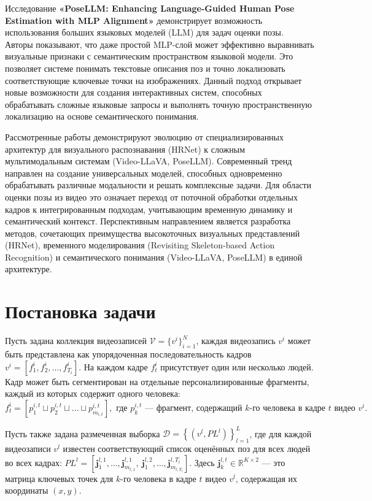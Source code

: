\documentclass{article}
\begin{document}
Исследование \textbf{«PoseLLM: Enhancing Language-Guided Human Pose Estimation with MLP Alignment»} демонстрирует возможность использования больших языковых моделей (LLM) для задач оценки позы. Авторы показывают, что даже простой MLP-слой может эффективно выравнивать визуальные признаки с семантическим пространством языковой модели. Это позволяет системе понимать текстовые описания поз и точно локализовать соответствующие ключевые точки на изображениях. Данный подход открывает новые возможности для создания интерактивных систем, способных обрабатывать сложные языковые запросы и выполнять точную пространственную локализацию на основе семантического понимания.

Рассмотренные работы демонстрируют эволюцию от специализированных архитектур для визуального распознавания (HRNet) к сложным мультимодальным системам (Video-LLaVA, PoseLLM). Современный тренд направлен на создание универсальных моделей, способных одновременно обрабатывать различные модальности и решать комплексные задачи. Для области оценки позы из видео это означает переход от поточной обработки отдельных кадров к интегрированным подходам, учитывающим временную динамику и семантический контекст. Перспективным направлением является разработка методов, сочетающих преимущества высокоточных визуальных представлений (HRNet), временного моделирования (Revisiting Skeleton-based Action Recognition) и семантического понимания (Video-LLaVA, PoseLLM) в единой архитектуре.

\section{Постановка задачи}

Пусть задана коллекция видеозаписей $
\mathcal{V} = \{v^i\}_{i=1}^N$, каждая видеозапись $v^i$ может быть представлена как упорядоченная последовательность кадров $
v^i = [f^i_1, f^i_2, \dots, f^i_{T_i}].
$
На каждом кадре $f^i_t$ присутствует один или несколько людей. Кадр может быть сегментирован на отдельные персонализированные фрагменты, каждый из которых содержит одного человека:
$$
f^i_t = [p^{i,t}_1 \sqcup p^{i,t}_2 \sqcup \dots \sqcup p^{i,t}_{m_{i,t}}],
\text{ где $p^{i,t}_k$ — фрагмент, содержащий $k$-го человека в кадре $t$ видео $v^i$}.
$$

Пусть также задана размеченная выборка $
\mathcal{D} = \left\{ (v^l, PL^l) \right\}_{l=1}^L$,
где для каждой видеозаписи $v^l$ известен соответствующий список оценённых поз для всех людей во всех кадрах:
$
PL^l = \left[ \mathbf{j}^{l,1}_1, \dots, \mathbf{j}^{l,1}_{m_{l,1}}, \ \mathbf{j}^{l,2}_1, \dots, \mathbf{j}^{l,T_l}_{m_{l,T_l}} \right].
$
Здесь $\mathbf{j}^{l,t}_k \in \mathbb{R}^{K \times 2}$ — это матрица ключевых точек для $k$-го человека в кадре $t$ видео $v^l$, содержащая их координаты $(x, y)$.
\end{document}
